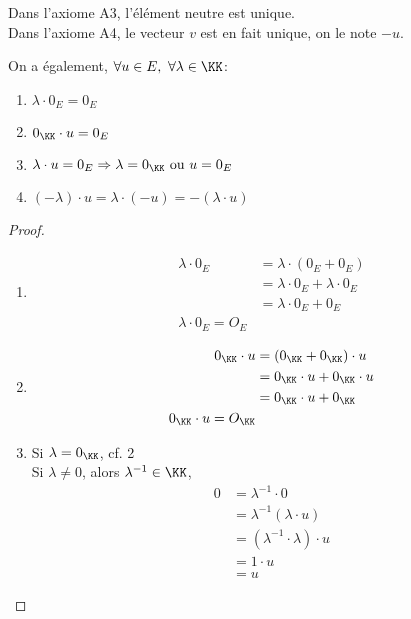 \documentclass[../main.tex]{subfile}
\begin{document}
\begin{rema}
	Dans l'axiome A3, l'élément neutre est unique.\\
	Dans l'axiome A4, le vecteur $v$ est en fait unique, on le note $-u$.
\end{rema}

\begin{prop}
	On a également, $\forall u \in E, \ \forall \lambda \in \KK$:
\begin{enumerate}
	\item $\lambda \cdot 0_E = 0_E$
	\item $0_{\KK} \cdot u = 0_E$
	\item $\lambda \cdot u = 0_E \Rightarrow \lambda = 0_\KK \ \text{ou} \ u = 0_E$
	\item $(-\lambda) \cdot u = \lambda \cdot (-u) = - (\lambda \cdot u)$
\end{enumerate}
\end{prop}

\begin{proof}
$\phantom{a}$
\begin{enumerate}
	\item 
$$
\begin{aligned}
	\lambda \cdot 0_E &= \lambda \cdot (0_E + 0_E)\\
	&= \lambda \cdot 0_E + \lambda \cdot 0_E\\
	&= \lambda \cdot 0_E + 0_E\\
	\lambda \cdot 0_E = O_E
\end{aligned}
$$
	\item 
$$
\begin{aligned}
	0_\KK \cdot u &=   (0_\KK + 0_\KK) \cdot u\\
	&= 0_\KK \cdot u + 0_\KK \cdot u\\
	&= 0_\KK \cdot u + 0_\KK\\
	0_\KK \cdot u = O_\KK
\end{aligned}
$$
	\item Si $\lambda = 0_\KK$, cf. 2\\
	Si $\lambda \neq 0$, alors $\lambda^{-1} \in \KK$,\\
$$
\begin{aligned}
	0 &= \lambda^{-1} \cdot 0 \\
	&= \lambda^{-1} (\lambda \cdot u) \\
	&= (\lambda^{-1} \cdot \lambda) \cdot u \\
	&= 1 \cdot u \\
	&= u
\end{aligned}$$

\end{enumerate}
\end{proof}
\end{document}
